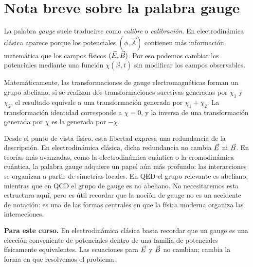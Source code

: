 \documentclass[../main.tex]{subfiles}
\begin{document}
\chapter{Nota breve sobre la palabra gauge}
\label{ap:gauge-teorias}

La palabra \emph{gauge} suele traducirse como \emph{calibre} o \emph{calibración}. En electrodinámica clásica aparece porque los potenciales $(\phi,\vec A)$ contienen más información matemática que los campos físicos $(\vec{E},\vec{B})$. Por eso podemos cambiar los potenciales mediante una función $\chi(\vec x,t)$ sin modificar los campos observables.

Matemáticamente, las transformaciones de gauge electromagnéticas forman un grupo abeliano: si se realizan dos transformaciones sucesivas generadas por $\chi_1$ y $\chi_2$, el resultado equivale a una transformación generada por $\chi_1+\chi_2$. La transformación identidad corresponde a $\chi=0$, y la inversa de una transformación generada por $\chi$ es la generada por $-\chi$.

Desde el punto de vista físico, esta libertad expresa una redundancia de la descripción. En electrodinámica clásica, dicha redundancia no cambia $\vec{E}$ ni $\vec{B}$. En teorías más avanzadas, como la electrodinámica cuántica o la cromodinámica cuántica, la palabra gauge adquiere un papel aún más profundo: las interacciones se organizan a partir de simetrías locales. En QED el grupo relevante es abeliano, mientras que en QCD el grupo de gauge es no abeliano. No necesitaremos esta estructura aquí, pero es útil recordar que la noción de gauge no es un accidente de notación: es una de las formas centrales en que la física moderna organiza las interacciones.

\begin{cajaidea}
\textbf{Para este curso.} En electrodinámica clásica basta recordar que un gauge es una elección conveniente de potenciales dentro de una familia de potenciales físicamente equivalentes. Las ecuaciones para $\vec{E}$ y $\vec{B}$ no cambian; cambia la forma en que resolvemos el problema.
\end{cajaidea}
\end{document}
